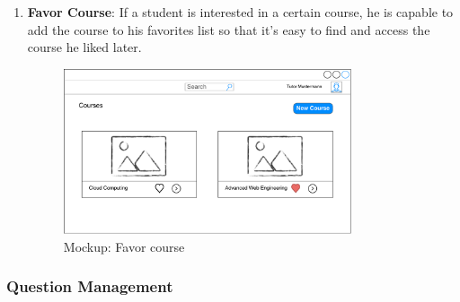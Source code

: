\begin{enumerate}
\item
\textbf{Favor Course}: If a student is interested in a certain course, he is capable to add the course to his favorites list so that it's easy to find and access the course he liked later.

\begin{figure}[!htbp]
  \centering
    \includegraphics[width=0.8\textwidth]{Figures/mockup/Favour-Course.pdf}
  \caption{Mockup: Favor course}
\end{figure}

\end{enumerate}

\subsubsection{Question Management}

